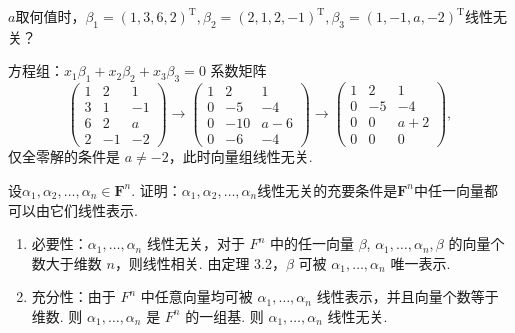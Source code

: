 \begin{exercise}
\begin{exgroup}
        \item $a$取何值时，$\beta_1=(1,3,6,2)^\mathrm{T},\beta_2=(2,1,2,-1)^\mathrm{T},\beta_3=(1,-1,a,-2)^\mathrm{T}$线性无关？
        \begin{answer}
            方程组：$x_1\beta_1+x_2\beta_2+x_3\beta_3=0$ 系数矩阵
            \[\begin{pmatrix}
                    1 & 2  & 1  \\
                    3 & 1  & -1 \\
                    6 & 2  & a  \\
                    2 & -1 &
                    -2\end{pmatrix}\rightarrow\begin{pmatrix}
                    1 & 2   & 1   \\
                    0 & -5  & -4  \\
                    0 & -10 & a-6 \\
                    0 & -6  & -4
                \end{pmatrix}\rightarrow\begin{pmatrix}
                    1 & 2  & 1   \\
                    0 & -5 & -4  \\
                    0 & 0  & a+2 \\
                    0 & 0  & 0
                \end{pmatrix},\]
            仅全零解的条件是 $a\neq-2$，此时向量组线性无关.
        \end{answer}

        \item 设$\alpha_1,\alpha_2,\ldots,\alpha_n\in\mathbf{F}^n$. 证明：$\alpha_1,\alpha_2,\ldots,\alpha_n$线性无关的充要条件是$\mathbf{F}^n$中任一向量都可以由它们线性表示.
        \begin{answer}
            \begin{enumerate}
                \item 必要性：$\alpha_1,\ldots,\alpha_n$ 线性无关，对于 $F^n$ 中的任一向量 $\beta$, $\alpha_1,\ldots,\alpha_n,\beta$ 的向量个数大于维数 $n$，则线性相关. 由定理 3.2，$\beta$ 可被 $\alpha_1,\ldots,\alpha_n$ 唯一表示.

                \item 充分性：由于 $F^n$ 中任意向量均可被 $\alpha_1,\ldots,\alpha_n$ 线性表示，并且向量个数等于维数. 则 $\alpha_1,\ldots,\alpha_n$ 是 $F^n$ 的一组基. 则 $\alpha_1,\ldots,\alpha_n$ 线性无关.


\end{enumerate}
\end{answer}
\end{exgroup}
\end{exercise}
